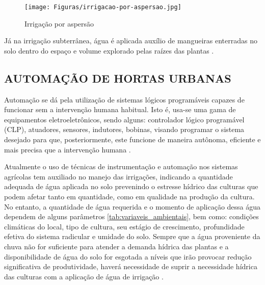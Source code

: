 \documentclass[%
  article,%
  a4paper,%
  12pt,%
  fleqn,%
  oneside,%
  chapter = TITLE,%
  section = TITLE,%
]{abntex2}
\begin{document}
\begin{figure}[!htb]
    
    \begin{minipage}{0.9\textwidth}
        \raggedright\caption{Irrigação por aspersão}
        \label{fig:irigaspersao}
    \end{minipage}%
    
    \begin{minipage}{0.9\textwidth}
        \raggedright
        \texttt{[image: Figuras/irrigacao-por-aspersao.jpg]}
    \end{minipage}
\end{figure}

Já na irrigação subterrânea, água é aplicada auxílio de mangueiras enterradas no solo dentro do espaço e volume explorado pelas raízes das plantas \cite{bernardo2006manual}.

\subsection{AUTOMAÇÃO DE HORTAS URBANAS }

Automação se dá pela utilização de sistemas lógicos programáveis capazes de funcionar   sem a   intervenção   humana   habitual.  Isto   é, usa-se   uma   gama de equipamentos eletroeletrônicos, sendo   alguns:   controlador   lógico   programável (CLP), atuadores, sensores, indutores, bobinas, visando programar o sistema desejado para que, posteriormente, este funcione de maneira autônoma, eficiente e mais precisa que a intervenção humana \cite{Ribeiro}.

Atualmente o uso de técnicas de instrumentação e automação nos sistemas agrícolas tem auxiliado no manejo das irrigações, indicando a quantidade adequada de água aplicada no solo prevenindo o estresse hídrico das culturas que podem afetar tanto em quantidade, como em qualidade na produção da cultura. No entanto, a quantidade de água requerida e o momento de aplicação dessa água dependem de alguns parâmetros \cref{tab:variaveis_ambientais}, bem como: condições climáticas do local, tipo de cultura, seu estágio de crescimento, profundidade efetiva do sistema radicular e umidade do solo. Sempre que a água proveniente da chuva não for suficiente para atender a demanda hídrica das plantas e a disponibilidade de água do solo for esgotada a níveis que irão provocar redução significativa de produtividade, haverá necessidade de suprir a necessidade hídrica das culturas com a aplicação de água de irrigação \cite{Roque2008}.
 
\end{document}
